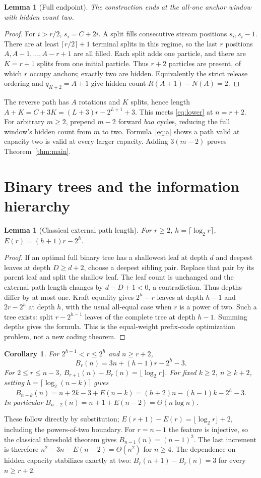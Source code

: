 \documentclass[11pt]{article}
\newtheorem{lemma}[theorem]{Lemma}
\newtheorem{corollary}[theorem]{Corollary}
\begin{document}
\begin{lemma}[Full endpoint]
The construction ends at the all-one anchor window with hidden count two.
\end{lemma}
\begin{proof}
For $i>r/2$, $s_i=C+2i$. A split fills consecutive stream positions
$s_i,s_i-1$. There are at least $\lceil r/2\rceil+1$ terminal splits in
this regime, so the last $r$ positions $A,A-1,\ldots,A-r+1$ are all filled.
Each split adds one particle, and there are $K=r+1$ splits from one initial
particle. Thus $r+2$ particles are present, of which $r$ occupy anchors;
exactly two are hidden. Equivalently the strict release ordering and
$q_{K+2}=A+1$ give hidden count $R(A+1)-N(A)=2$.
\end{proof}

The reverse path has $A$ rotations and $K$ splits, hence length
$A+K=C+3K=(L+3)r-2^{L+1}+3$. This meets \eqref{eq:lower} at $n=r+2$.
For arbitrary $m\ge2$, prepend $m-2$ forward $baa$ cycles, reducing the
full window's hidden count from $m$ to two. Formula~\eqref{eq:a} shows a
path valid at capacity two is valid at every larger capacity. Adding
$3(m-2)$ proves Theorem~\ref{thm:main}.

\section{Binary trees and the information hierarchy}
\begin{lemma}[Classical external path length]
For $r\ge2$, $h=\lceil\log_2r\rceil$,
$E(r)=(h+1)r-2^h$.
\end{lemma}
\begin{proof}
If an optimal full binary tree has a shallowest leaf at depth $d$ and
deepest leaves at depth $D\ge d+2$, choose a deepest sibling pair. Replace
that pair by its parent leaf and split the shallow leaf. The leaf count is
unchanged and the external path length changes by $d-D+1<0$, a
contradiction. Thus depths differ by at most one. Kraft equality gives
$2^h-r$ leaves at depth $h-1$ and $2r-2^h$ at depth $h$, with the usual
all-equal case when $r$ is a power of two. Such a tree exists: split
$r-2^{h-1}$ leaves of the complete tree at depth $h-1$. Summing depths
gives the formula. This is the equal-weight prefix-code optimization
problem, not a new coding theorem.
\end{proof}

\begin{corollary}
For $2^{h-1}<r\le2^h$ and $n\ge r+2$,
\[
B_r(n)=3n+(h-1)r-2^h-3.
\]
For $2\le r\le n-3$, $B_{r+1}(n)-B_r(n)=\lfloor\log_2r\rfloor$.
For fixed $k\ge2$, $n\ge k+2$, setting $h=\lceil\log_2(n-k)\rceil$ gives
\[
B_{n-k}(n)=n+2k-3+E(n-k)=(h+2)n-(h-1)k-2^h-3.
\]
In particular $B_{n-2}(n)=n+1+E(n-2)=\Theta(n\log n)$.
\end{corollary}
These follow directly by substitution; $E(r+1)-E(r)=\lfloor\log_2r\rfloor+2$,
including the powers-of-two boundary. For $r=n-1$ the feature is injective,
so the classical threshold theorem \cite{volkov} gives
$B_{n-1}(n)=(n-1)^2$. The last increment is therefore
$n^2-3n-E(n-2)=\Theta(n^2)$ for $n\ge4$.
The dependence on hidden capacity stabilizes exactly at two:
$B_r(n+1)-B_r(n)=3$ for every $n\ge r+2$.
\end{document}
